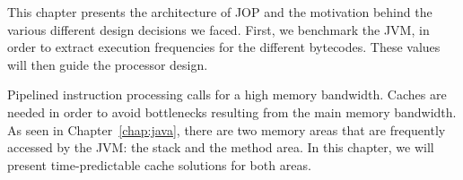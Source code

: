 This chapter presents the architecture of JOP and the motivation
behind the various different design decisions we faced. First, we
benchmark the JVM, in order to extract execution frequencies for the
different bytecodes. These values will then guide the processor
design.

Pipelined instruction processing calls for a high memory bandwidth.
Caches are needed in order to avoid bottlenecks resulting from the
main memory bandwidth. As seen in Chapter~\ref{chap:java}, there are
two memory areas that are frequently accessed by the JVM: the stack
and the method area. In this chapter, we will present
time-predictable cache solutions for both areas.
